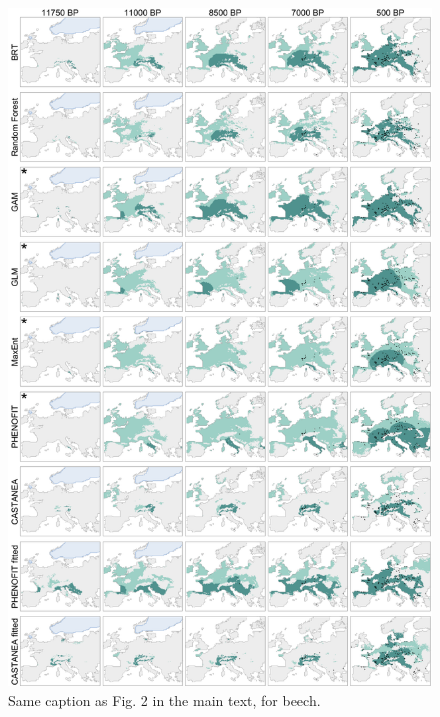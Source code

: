 
\begin{figure}
\hspace*{-0.3in}
\centering
\includegraphics{chapter2/figs/supp/figs4_fagus_simulations-1.pdf}
\caption{Same caption as Fig. 2 in the main text, for beech.}
\label{fig:S4}
\end{figure}

